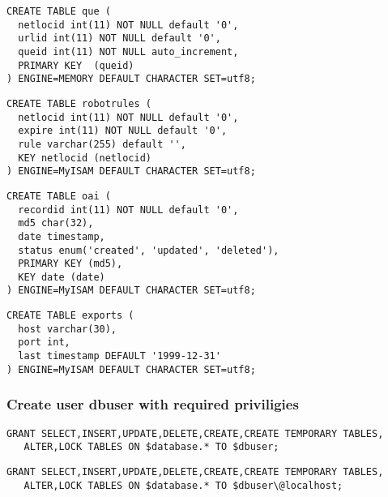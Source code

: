 \begin{verbatim}
CREATE TABLE que (
  netlocid int(11) NOT NULL default '0',
  urlid int(11) NOT NULL default '0',
  queid int(11) NOT NULL auto_increment,
  PRIMARY KEY  (queid)
) ENGINE=MEMORY DEFAULT CHARACTER SET=utf8;
\end{verbatim}

\begin{verbatim}
CREATE TABLE robotrules (
  netlocid int(11) NOT NULL default '0',
  expire int(11) NOT NULL default '0',
  rule varchar(255) default '',
  KEY netlocid (netlocid)
) ENGINE=MyISAM DEFAULT CHARACTER SET=utf8;
\end{verbatim}

\begin{verbatim}
CREATE TABLE oai (
  recordid int(11) NOT NULL default '0',
  md5 char(32),
  date timestamp,
  status enum('created', 'updated', 'deleted'),
  PRIMARY KEY (md5),
  KEY date (date)
) ENGINE=MyISAM DEFAULT CHARACTER SET=utf8;
\end{verbatim}

\begin{verbatim}
CREATE TABLE exports (
  host varchar(30),
  port int,
  last timestamp DEFAULT '1999-12-31'
) ENGINE=MyISAM DEFAULT CHARACTER SET=utf8;
\end{verbatim}

\subsubsection{Create user dbuser with required priviligies}
\begin{verbatim}
GRANT SELECT,INSERT,UPDATE,DELETE,CREATE,CREATE TEMPORARY TABLES,
   ALTER,LOCK TABLES ON $database.* TO $dbuser;
\end{verbatim}

\begin{verbatim}
GRANT SELECT,INSERT,UPDATE,DELETE,CREATE,CREATE TEMPORARY TABLES,
   ALTER,LOCK TABLES ON $database.* TO $dbuser\@localhost;
\end{verbatim}

